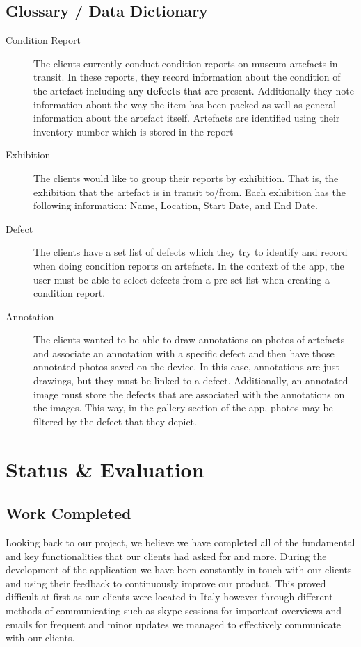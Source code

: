 \documentclass[12pt]{article}
\begin{document}
\subsection{Glossary / Data Dictionary}
\begin{description}
\item [Condition Report] The clients currently conduct condition reports on museum artefacts in transit. In these reports, they record information about the condition of the artefact including any \textbf{defects} that are present. Additionally they note information about the way the item has been packed as well as general information about the artefact itself. Artefacts are identified using their inventory number which is stored in the report

\item [Exhibition] The clients would like to group their reports by exhibition. That is, the exhibition that the artefact is in transit to/from. Each exhibition has the following information: Name, Location, Start Date, and End Date.

\item [Defect] The clients have a set list of defects which they try to identify and record when doing condition reports on artefacts. In the context of the app, the user must be able to select defects from a pre set list when creating a condition report.

\item [Annotation] The clients wanted to be able to draw annotations on photos of artefacts and associate an annotation with a specific defect and then have those annotated photos saved on the device. In this case, annotations are just drawings, but they must be linked to a defect. Additionally, an annotated image must store the defects that are associated with the annotations on the images. This way, in the gallery section of the app, photos may be filtered by the defect that they depict. 
\end{description}






\newpage
\section{Status \& Evaluation}
\subsection{Work Completed}
Looking back to our project, we believe we have completed all of the fundamental and key functionalities that our clients had asked for and more. During the development of the application we have been constantly in touch with our clients and using their feedback to continuously improve our product. This proved difficult at first as our clients were located in Italy however through different methods of communicating such as skype sessions for important overviews and emails for frequent and minor updates we managed to effectively communicate with our clients. 
\end{document}
